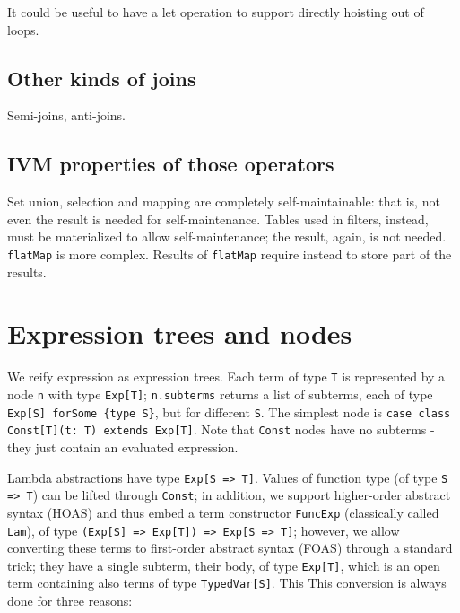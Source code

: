 \documentclass{article}
\begin{document}
It could be useful to have a let operation to support directly hoisting
out of loops.

\subsection{Other kinds of joins}

Semi-joins, anti-joins.

\subsection{IVM properties of those operators}

Set union, selection and mapping are completely self-maintainable: that
is, not even the result is needed for self-maintenance. Tables used in
filters, instead, must be materialized to allow self-maintenance; the
result, again, is not needed. \texttt{flatMap} is more complex. Results
of \texttt{flatMap} require instead to store part of the results.

\section{Expression trees and nodes}

We reify expression as expression trees. Each term of type \texttt{T} is
represented by a node \texttt{n} with type \texttt{Exp{[}T{]}};
\texttt{n.subterms} returns a list of subterms, each of type
\texttt{Exp{[}S{]} forSome \{type S\}}, but for different \texttt{S}.
The simplest node is
\texttt{case class Const{[}T{]}(t: T) extends Exp{[}T{]}}. Note that
\texttt{Const} nodes have no subterms - they just contain an evaluated
expression.

Lambda abstractions have type \texttt{Exp{[}S =\textgreater{} T{]}}.
Values of function type (of type \texttt{S =\textgreater{} T}) can be
lifted through \texttt{Const}; in addition, we support higher-order
abstract syntax (HOAS) and thus embed a term constructor
\texttt{FuncExp} (classically called \texttt{Lam}), of type
\texttt{(Exp{[}S{]} =\textgreater{} Exp{[}T{]}) =\textgreater{} Exp{[}S =\textgreater{} T{]}};
however, we allow converting these terms to first-order abstract syntax
(FOAS) through a standard trick; they have a single subterm, their body,
of type \texttt{Exp{[}T{]}}, which is an open term containing also terms
of type \texttt{TypedVar{[}S{]}}. This This conversion is always done
for three reasons:
\end{document}
